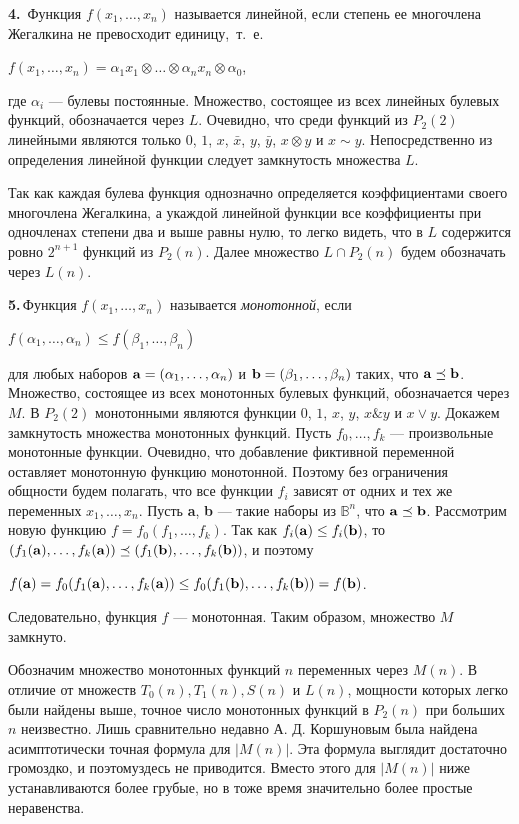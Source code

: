 \documentclass[10pt]{article}
\begin{document}
{\bf{4.}}\, Функция $f(x_1, \dots,x_n)$ называется линейной, если степень ее многочлена
Жегалкина не превосходит единицу,~т.~е.
\begin{center} $f(x_1, \dots, x_n) = \alpha_1 x_1 \otimes \dots \otimes \alpha_n x_n \otimes \alpha_0$,\end{center}
где $\alpha_i$ — булевы постоянные. Множество, состоящее из всех линейных булевых
функций, обозначается через $L$. Очевидно, что среди функций из $P_2(2)$
линейными являются только $0$, $1$, $x$, $\bar{x}$, $y$, $\bar{y}$, $x \otimes y$ и $x \sim y$. Непосредственно
из определения линейной функции следует замкнутость множества $L$.\par
Так как каждая булева функция однозначно определяется коэффициентами
своего многочлена Жегалкина, а укаждой линейной функции все
коэффициенты при одночленах степени два и выше равны нулю, то легко
видеть, что в $L$ содержится ровно $2^{n+1}$ функций из $P_2(n)$.
Далее множество $L \cap P_2(n)$ будем обозначать через $L(n)$.\par
{\bf{5.}}\,Функция $f(x_1, \dots, x_n)$ называется \textit{монотонной}, если
\begin{center} $f(\alpha_1, \dots, \alpha_n) \le f(\beta_1, \dots, \beta_n)$\end{center}
для любых наборов ${\bf{a}}=(\alpha_1, \dots, \alpha_n)$ и ${\bf{b}}=(\beta_1, \dots, \beta_n)$ таких,
что ${\bf a}\preceq{\bf b}$. Множество, состоящее из всех монотонных булевых функций, обозначается через $M$.
В $P_2(2)$ монотонными являются функции 0, $1$, $x$, $y$, $x \& y$ и $x \vee y$.
Докажем замкнутость множества монотонных функций. Пусть $f_0, \dots, f_k$
— произвольные монотонные функции. Очевидно, что добавление фиктивной
переменной оставляет монотонную функцию монотонной. Поэтому без
ограничения общности будем полагать, что все функции $f_i$ зависят от одних
и тех же переменных $x_1, \dots, x_n$. Пусть {\bf{a}}, {\bf{b}} — такие наборы из $\mathbb{B}^n$, что ${\bf{a}} \preceq {\bf{b}}$.
Рассмотрим новую функцию $f=f_0(f_1, \dots, f_k)$. Так как $f_i({\bf{a}}) \le f_i({\bf{b}})$, то $(f_1({\bf{a}}), \dots, f_k({\bf{a}})) \preceq (f_1({\bf{b}}), \dots, f_k({\bf{b}}))$, и поэтому
\begin{center} $f({\bf{a}})=f_0(f_1({\bf{a}}), \dots, f_k({\bf{a}})) \le f_0(f_1({\bf{b}}), \dots, f_k({\bf{b}})) = f({\bf{b}})$.\end{center}
Следовательно, функция $f$ — монотонная. Таким образом, множество $M$ замкнуто.\par
Обозначим множество монотонных функций $n$ переменных через $M(n)$. В отличие от множеств $T_0(n),
T_1(n), S(n)$ и $L(n)$, мощности которых легко были найдены выше, точное число монотонных
функций в $P_2(n)$ при больших $n$ неизвестно. Лишь сравнительно недавно А. Д. Коршуновым была
найдена асимптотически точная формула для $|M(n)|$. Эта формула выглядит достаточно громоздко,
и поэтомуздесь не приводится. Вместо этого
для $|M(n)|$ ниже устанавливаются более грубые, но в тоже время значительно более простые неравенства.
\end{document}
